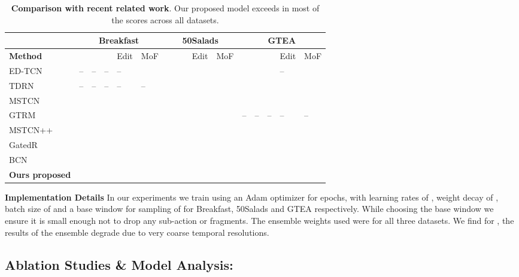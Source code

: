\documentclass[10pt,twocolumn,letterpaper]{article}
\begin{document}
\begin{table*}[t]
\begin{center}
\small{
\begin{tabular}{p{2.3cm} | p{0.5cm}p{0.5cm}p{0.5cm}p{0.6cm}p{0.6cm} | p{0.5cm}p{0.5cm}p{0.5cm}p{0.6cm}p{0.6cm} | p{0.5cm}p{0.5cm}p{0.5cm}p{0.6cm}p{0.6cm}}
\hline
& \multicolumn{5}{c|}{Breakfast} & \multicolumn{5}{c|}{50Salads} & \multicolumn{5}{c}{GTEA}\\
\hline
\textbf{Method} & \multicolumn{3}{c}{} & Edit & MoF & \multicolumn{3}{c}{} & Edit & MoF & \multicolumn{3}{c}{} & Edit & MoF\\
\hline\hline
ED-TCN\cite{TED-lea2017temporal} & -- & -- & -- & -- &  &  &  &  &  &  &  &  &  & -- & \\
TDRN\cite{TEDresi-lei2018temporal} & -- & -- & -- & -- & -- &  &  &  &  &  &  &  &   &   &  \\
MSTCN\cite{farha2019ms} &  &  &  &  &  &  &  &  &  &   &  &  &  &  & \\
GTRM\cite{huang2020improving} &  &  &  &  &  &  &  &  &  &   & -- & -- & -- & -- & -- \\

MSTCN++\cite{li2020ms} &  &  &  &  &  &  &  &  &  &  &  &  &  &  & \\
GatedR\cite{wang2020gated} &  &  &  &  &  &  &  &  &  &  &  &  &  &  &  \\
BCN\cite{wang2020boundary} & 	&  &  &  &  &  &  &  &  &  &  &  &  &	 & \\
\hline
\textbf{Ours proposed} &  &  &  &  &  &  &  &  &  &  &  &  &  &  &  \\
\hline\hline
\end{tabular}
}
\end{center}
\caption{\textbf{Comparison with recent related work}. Our proposed model exceeds in most of the scores across all datasets.}\label{tab:final result}
\end{table*}

\textbf{Implementation Details} In our experiments we train using an Adam optimizer for  epochs, with learning rates of , weight decay of , batch size of  and a base window for sampling  of  for Breakfast, 50Salads and GTEA respectively. While choosing the base window we ensure it is small enough not to drop any sub-action or fragments. The ensemble weights used were  for all three datasets. We find for , the results of the ensemble degrade due to very coarse temporal resolutions.

\subsection{Ablation Studies \& Model Analysis:} 
\end{document}
